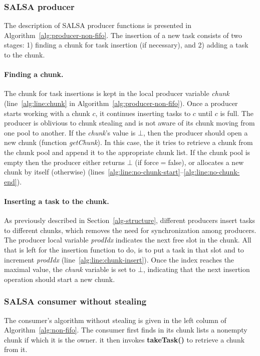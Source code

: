 \subsubsection {SALSA producer}

The description of SALSA producer functions is presented in Algorithm~\ref{alg:producer-non-fifo}. 
The insertion of a new task consists of two stages: 
1) finding a chunk for task insertion (if necessary), and 2) adding a task to the chunk. 

\paragraph {Finding a chunk.}
The chunk for task insertions is kept in the local producer variable \emph{chunk} (line~\ref{alg:line:chunk} in Algorithm~\ref{alg:producer-non-fifo}). 
Once a producer starts working with a chunk $c$, it continues inserting tasks to $c$ until $c$ is full. 
The producer is oblivious to chunk stealing and is not aware of its chunk moving from one pool to another. 
If the \emph{chunk}'s value is $\bot$, then the producer should open a new chunk (function \emph{getChunk}). 
In this case, the it tries to retrieve a chunk from the chunk pool and append it to the appropriate chunk list. If the chunk pool is empty then the producer either returns $\bot$ (if force$=$false), or allocates a new chunk by itself (otherwise) (lines~\ref{alg:line:no-chunk-start}--\ref{alg:line:no-chunk-end}). 

\paragraph {Inserting a task to the chunk.}
As previously described in Section~\ref{alg-structure}, different producers insert tasks to different chunks, which removes the need for synchronization among producers. 
The producer local variable \emph{prodIdx} indicates the next free slot in the chunk.
All that is left for the insertion function to do, is to put a task in that slot and to increment \emph{prodIdx} (line~\ref{alg:line:chunk-insert}).
Once the index reaches the maximal value, the \emph{chunk} variable is set to $\bot$, indicating that the next insertion operation should start a new chunk. 

\subsubsection {SALSA consumer without stealing}

The consumer's algorithm without stealing is given in the left column of Algorithm~\ref{alg:non-fifo}.
The consumer first finds in its chunk lists a nonempty chunk if which it is the owner. it then invokes {\bf takeTask()} to retrieve a chunk from it.

